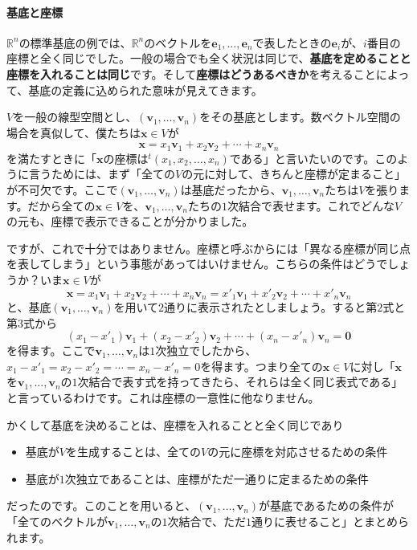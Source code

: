 \paragraph{基底と座標}

$\mathbb{R}^n$の標準基底の例では、$\mathbb{R}^n$のベクトルを$\bm{e}_1,\ldots,\bm{e}_n$で表したときの$\bm{e}_i$が、$i$番目の座標と全く同じでした。一般の場合でも全く状況は同じで、\textbf{基底を定めることと座標を入れることは同じ}です。そして\textbf{座標はどうあるべきか}を考えることによって、基底の定義に込められた意味が見えてきます。

$V$を一般の線型空間とし、$(\bm{v}_1,\ldots,\bm{v}_n)$をその基底とします。数ベクトル空間の場合を真似して、僕たちは$\bm{x}\in V$が
\[
\bm{x} = x_1\bm{v}_1 + x_2\bm{v}_2 + \cdots + x_n\bm{v}_n
\]
を満たすときに「$\bm{x}$の座標は${}^t (x_1, x_2, \ldots, x_n)$である」と言いたいのです。このように言うためには、まず「全ての$V$の元に対して、きちんと座標が定まること」が不可欠です。ここで$(\bm{v}_1,\ldots,\bm{v}_n)$は基底だったから、$\bm{v}_1,\ldots,\bm{v}_n$たちは$V$を張ります。だから全ての$\bm{x} \in V$を、$\bm{v}_1,\ldots,\bm{v}_n$たちの$1$次結合で表せます。これでどんな$V$の元も、座標で表示できることが分かりました。

ですが、これで十分ではありません。座標と呼ぶからには「異なる座標が同じ点を表してしまう」という事態があってはいけません。こちらの条件はどうでしょうか？いま$\bm{x} \in V$が
\[
\bm{x} = x_1\bm{v}_1 + x_2\bm{v}_2 + \cdots + x_n\bm{v}_n = x'_1 \bm{v}_1 + x'_2\bm{v}_2 + \cdots + x'_n \bm{v}_n
\]
と、基底$(\bm{v}_1,\ldots,\bm{v}_n)$を用いて$2$通りに表示されたとしましょう。すると第$2$式と第$3$式から
\[
(x_1 - x'_1)\bm{v}_1 + (x_2 - x'_2)\bm{v}_2 + \cdots + (x_n - x'_n)\bm{v}_n = \bm{0}
\]
を得ます。ここで$\bm{v}_1,\ldots,\bm{v}_n$は$1$次独立でしたから、$x_1 - x'_1 = x_2 - x'_2 = \cdots = x_n - x'_n = 0$を得ます。つまり全ての$\bm{x} \in V$に対し「$\bm{x}$を$\bm{v}_1,\ldots,\bm{v}_n$の$1$次結合で表す式を持ってきたら、それらは全く同じ表式である」と言っているわけです。これは座標の一意性に他なりません。

かくして基底を決めることは、座標を入れることと全く同じであり
\begin{itemize}
\item 基底が$V$を生成することは、全ての$V$の元に座標を対応させるための条件
\item 基底が$1$次独立であることは、座標がただ一通りに定まるための条件
\end{itemize}
だったのです。このことを用いると、$(\bm{v}_1, \ldots, \bm{v}_n)$が基底であるための条件が「全てのベクトルが$\bm{v}_1,\ldots,\bm{v}_n$の$1$次結合で、ただ$1$通りに表せること」とまとめられます。

